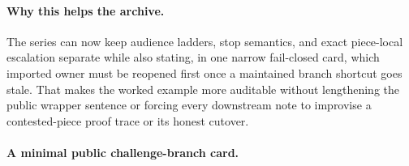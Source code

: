 \documentclass[11pt]{article}
\begin{document}
\paragraph{Why this helps the archive.}
The series can now keep audience ladders, stop semantics, and exact piece-local escalation separate while also stating, in one narrow fail-closed card, which imported owner must be reopened first once a maintained branch shortcut goes stale.
That makes the worked example more auditable without lengthening the public wrapper sentence or forcing every downstream note to improvise a contested-piece proof trace or its honest cutover.


\paragraph{A minimal public challenge-branch card.}
\end{document}
